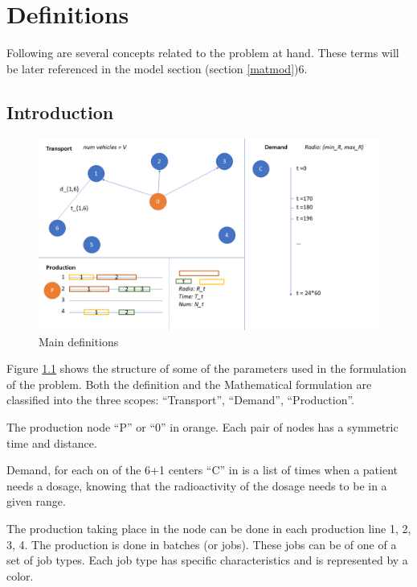 
\chapter{Definitions}
\label{def}

Following are several concepts related to the problem at hand. These terms will be later referenced in the model section (section \ref{matmod})6.

\section{Introduction}

\begin{figure}
	\centering
		\includegraphics[width=\textwidth]{imagenes/definitions.png}
	\caption{Main definitions}
	\label{fig:definitions}
\end{figure}

Figure \ref{fig:definitions} shows the structure of some of the parameters used in the formulation of the problem. Both the definition and the Mathematical formulation are classified into the three scopes: "`Transport"', "`Demand"', "`Production"'.

The production node "`P"' or "`0"' in orange. Each pair of nodes has a symmetric time and distance.

Demand, for each on of the 6+1 centers "`C"' in is a list of times when a patient needs a dosage, knowing that the radioactivity of the dosage needs to be in a given range.

The production taking place in the node can be done in each production line {1, 2, 3, 4}.
The production is done in batches (or jobs). These jobs can be of one of a set of job types. Each job type has specific characteristics and is represented by a color.


